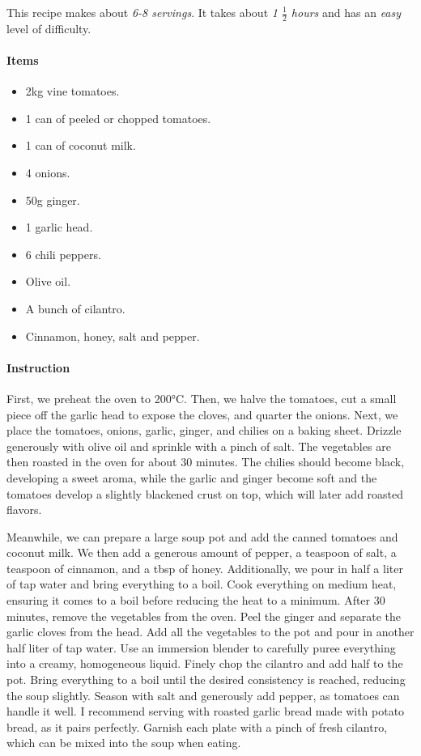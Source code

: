 This recipe makes about \emph{6-8 servings}. It takes about \emph{1 $\frac{1}{2}$ hours} and has an \emph{easy} level of difficulty. 

\paragraph{Items}
\begin{itemize}[noitemsep]
	\item[\ding{182}] 2kg vine tomatoes.
	\item[\ding{183}] 1 can of peeled or chopped tomatoes.
	\item[\ding{184}] 1 can of coconut milk.
	\item[\ding{185}] 4 onions.
	\item[\ding{186}] 50g ginger.
	\item[\ding{187}] 1 garlic head.
	\item[\ding{188}] 6 chili peppers.
	\item[\ding{189}] Olive oil.
	\item[\ding{190}] A bunch of cilantro.
	\item[\ding{191}] Cinnamon, honey, salt and pepper.
\end{itemize}

\paragraph{Instruction} First, we preheat the oven to 200°C. Then, we halve the tomatoes, cut a small piece off the garlic head to expose the cloves, and quarter the onions. Next, we place the tomatoes, onions, garlic, ginger, and chilies on a baking sheet. Drizzle generously with olive oil and sprinkle with a pinch of salt. The vegetables are then roasted in the oven for about 30 minutes. The chilies should become black, developing a sweet aroma, while the garlic and ginger become soft and the tomatoes develop a slightly blackened crust on top, which will later add roasted flavors.

Meanwhile, we can prepare a large soup pot and add the canned tomatoes and coconut milk. We then add a generous amount of pepper, a teaspoon of salt, a teaspoon of cinnamon, and a tbsp of honey. Additionally, we pour in half a liter of tap water and bring everything to a boil. Cook everything on medium heat, ensuring it comes to a boil before reducing the heat to a minimum. After 30 minutes, remove the vegetables from the oven. Peel the ginger and separate the garlic cloves from the head. Add all the vegetables to the pot and pour in another half liter of tap water. Use an immersion blender to carefully puree everything into a creamy, homogeneous liquid. Finely chop the cilantro and add half to the pot. Bring everything to a boil until the desired consistency is reached, reducing the soup slightly. Season with salt and generously add pepper, as tomatoes can handle it well. I recommend serving with roasted garlic bread made with potato bread, as it pairs perfectly. Garnish each plate with a pinch of fresh cilantro, which can be mixed into the soup when eating.
